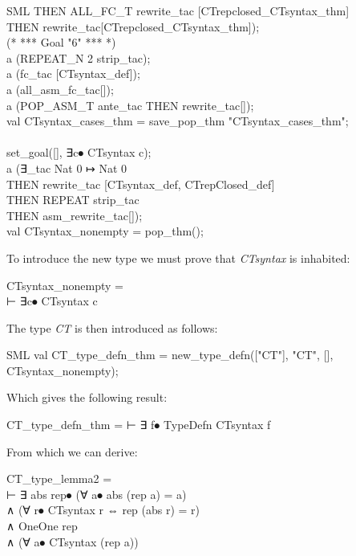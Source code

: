{\begin{GFT}{SML}
\+	THEN ALL\_FC\_T rewrite\_tac [CTrepclosed\_CTsyntax\_thm]\\
\+	THEN rewrite\_tac[CTrepclosed\_CTsyntax\_thm]);\\
\+(* *** Goal "6" *** *)\\
\+a (REPEAT\_N 2 strip\_tac);\\
\+a (fc\_tac [CTsyntax\_def]);\\
\+a (all\_asm\_fc\_tac[]);\\
\+a (POP\_ASM\_T ante\_tac THEN rewrite\_tac[]);\\
\+val CTsyntax\_cases\_thm = save\_pop\_thm "CTsyntax\_cases\_thm";\\
\+\\
\+set\_goal([], \PrKM{}∃c⦁ CTsyntax c\PrKO{});\\
\+a (∃\_tac \PrKM{}Nat 0 ↦ Nat 0\PrKO{}\\
\+	THEN rewrite\_tac [CTsyntax\_def, CTrepClosed\_def]\\
\+	THEN REPEAT strip\_tac\\
\+	THEN asm\_rewrite\_tac[]);\\
\+val CTsyntax\_nonempty = pop\_thm();\\
\end{GFT}
}%

To introduce the new type we must prove that \emph{CTsyntax} is inhabited: 

\begin{GFT}{}
\+\PrNL{}CTsyntax\_nonempty\PrNN{} = \\
\+	⊢ ∃c⦁ CTsyntax c\\
\end{GFT}

The type \emph{CT} is then introduced as follows:

\begin{GFT}{SML}
\+val CT\_type\_defn\_thm = new\_type\_defn(["CT"], "CT", [], CTsyntax\_nonempty);\\
\end{GFT}

Which gives the following result:
\begin{GFT}{}
\+\PrNL{}CT\_type\_defn\_thm\PrNN{} = ⊢ ∃ f⦁ TypeDefn CTsyntax f\\
\end{GFT}

From which we can derive:

\begin{GFT}{}
\+\PrNL{}CT\_type\_lemma2\PrNN{} =\\
\+	⊢ ∃ abs rep⦁ (∀ a⦁ abs (rep a) = a)\\
\+         ∧ (∀ r⦁ CTsyntax r ⇔ rep (abs r) = r)\\
\+         ∧ OneOne rep\\
\+         ∧ (∀ a⦁ CTsyntax (rep a))\\
\end{GFT}

